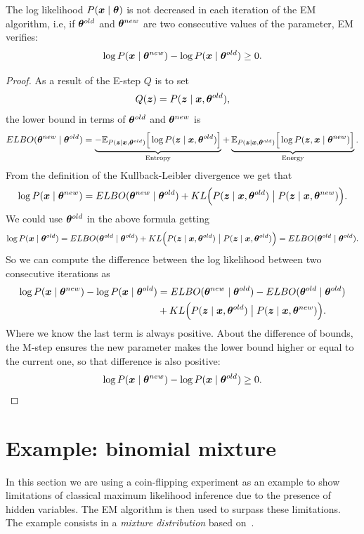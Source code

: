 \begin{proposition}
  The log likelihood \(P(\bm{x} \mid \bm{\theta})\) is not decreased in each iteration of the EM algorithm, i.e, if \(\bm{\theta}^{old}\) and \(\bm{\theta}^{new}\) are two consecutive values of the parameter, EM verifies:
  \[
    \log{P(\bm{x}\mid \bm{\theta}^{new})} - \log{P(\bm{x}\mid \bm{\theta}^{old})} \geq 0.
  \]
\end{proposition}
\begin{proof}
As a result of the E-step \(Q\) is to set
\[
  Q(\bm{z}) = P(\bm{z} \mid \bm{x}, \bm{\theta}^{old}),
\]
the lower bound in terms of \(\bm{\theta}^{old}\) and \(\bm{\theta}^{new}\) is
\[
  ELBO(\bm{\theta}^{new} \mid \bm{\theta}^{old}) =  \underbrace{-\mathbb{E}_{P(\bm{z} \mid \bm{x}, \bm{\theta}^{old})}\Big[\log{P(\bm{z}\mid \bm{x}, \bm{\theta}^{old})}\Big]}_{\text{Entropy}} + \underbrace{\mathbb{E}_{P(\bm{z} \mid \bm{x}, \bm{\theta}^{old})}\Big[\log{P(\bm{z},\bm{x}\mid \bm{\theta}^{new})}\Big]}_{\text{Energy}}.
\]
From the definition of the Kullback-Leibler divergence we get that
\[
  \log{P(\bm{x}\mid \bm{\theta}^{new})} = ELBO(\bm{\theta}^{new}\mid \bm{\theta}^{old}) + KL\Big(P(\bm{z} \mid \bm{x}, \bm{\theta}^{old}) \bigm| P(\bm{z} \mid \bm{x}, \bm{\theta}^{new})\Big).
\]
We could use \(\bm{\theta}^{old}\) in the above formula getting
\[
  \log{P(\bm{x}\mid \bm{\theta}^{old})} = ELBO(\bm{\theta}^{old} \mid \bm{\theta}^{old}) + KL\Big(P(\bm{z} \mid \bm{x}, \bm{\theta}^{old}) \bigm| P(\bm{z} \mid \bm{x}, \bm{\theta}^{old})\Big) = ELBO(\bm{\theta}^{old} \mid \bm{\theta}^{old}).
\]
So we can compute the difference between the log likelihood between two consecutive iterations as
\[
  \begin{aligned}
    \log{P(\bm{x}\mid \bm{\theta}^{new})} - \log{P(\bm{x}\mid \bm{\theta}^{old})} &= ELBO(\bm{\theta}^{new}\mid \bm{\theta}^{old}) - ELBO(\bm{\theta}^{old} \mid \bm{\theta}^{old})\\
    &+  KL\Big(P(\bm{z} \mid \bm{x}, \bm{\theta}^{old}) \bigm| P(\bm{z} \mid \bm{x}, \bm{\theta}^{new})\Big).
  \end{aligned}
\]
Where we know the last term is always positive. About the difference of bounds, the M-step ensures the new parameter makes the lower bound higher or equal to the current one, so that difference is also positive:
\[
   \log{P(\bm{x}\mid \bm{\theta}^{new})} - \log{P(\bm{x}\mid \bm{\theta}^{old})} \geq 0.
 \]
\end{proof}


\section{Example: binomial mixture}
In this section we are using a coin-flipping experiment as an example to show limitations of classical maximum likelihood inference due to the presence of hidden variables. The EM algorithm is then used to surpass these limitations. The example consists in a \emph{mixture distribution} based on~\cite{do2008expectation}.

